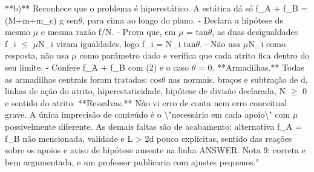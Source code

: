 \documentclass{article}%
\begin{document}
\newline%
**b)** Reconhece que o problema é hiperestático. A estática dá só f\_A + f\_B = (M+m+m\_c) g sen$\theta$, para cima ao longo do plano.\newline%
{-} Declara a hipótese de mesmo $\mu$ e mesma razão f/N.\newline%
{-} Prova que, em $\mu$ = tan$\theta$, as duas desigualdades f\_i $\leq$ $\mu$N\_i viram igualdades, logo f\_i = N\_i tan$\theta$.\newline%
{-} Não usa $\mu$N\_i como resposta, não usa $\mu$ como parâmetro dado e verifica que cada atrito fica dentro do seu limite.\newline%
{-} Confere f\_A + f\_B com (2) e o caso $\theta$ = 0.\newline%
\newline%
**Armadilhas.** Todas as armadilhas centrais foram tratadas: cos$\theta$ nas normais, braços e subtração de d, linhas de ação do atrito, hiperestaticidade, hipótese de divisão declarada, N $\geq$ 0 e sentido do atrito.\newline%
\newline%
**Ressalvas.** Não vi erro de conta nem erro conceitual grave. A única imprecisão de conteúdo é o \textbackslash{}"necessário em cada apoio\textbackslash{}" com $\mu$ possivelmente diferente. As demais faltas são de acabamento: alternativa f\_A = f\_B não mencionada, validade e L > 2d pouco explícitas, sentido das reações sobre os apoios e aviso de hipótese ausente na linha ANSWER. Nota 9: correta e bem argumentada, e um professor publicaria com ajustes pequenos."%
\end{document}
